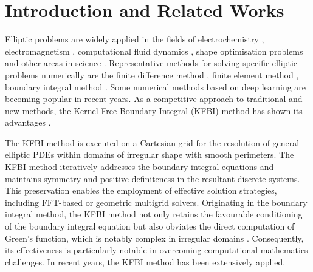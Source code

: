 \documentclass{article}
\begin{document}
\section{Introduction and Related Works}
Elliptic problems are widely applied in the fields of electrochemistry \cite{QIAN2021109908,DING2019108864}, electromagnetism \cite{Chai2023}, computational fluid dynamics \cite{Greengard1998318, Quartapelle1993NumericalSO}, shape optimisation problems \cite{ZHU2011752,gong2023} and other areas in science \cite{Chapko199747,ZHOU20061,CHENG2006616,SUN2014445}. Representative methods for solving specific elliptic problems numerically are the finite difference method \cite{zhou2006high, fedkiw1999non, leveque1994immersed, mccorquodale2001cartesian, berthelsen2004decomposed,johansen1998cartesian,twizell1996second,wiegmann2000explicit,hou2012numerical}, finite element method \cite{li2003newinterface,li1999fem,HUANG2017439,chu2010, wen2018finite, HOU2005411} , boundary integral method \cite{jwason1963,YING2004591,YING2006247,greengard_rokhlin_1997}. Some numerical methods based on deep learning \cite{E2018deepRitz,Raissi2019a,lulu2021deeponet,li2021fourier,Zang_2020,fan2023decoupling,HU2022111576,HE2022114358} are becoming popular in recent years. As a competitive approach to traditional and new methods, the Kernel-Free Boundary Integral (KFBI) method \cite{ying2007kernel,ying2014kernel,ying2013kernel} has shown its advantages .

The KFBI method is executed on a Cartesian grid for the resolution of general elliptic PDEs within domains of irregular shape with smooth perimeters. The KFBI method iteratively addresses the boundary integral equations and maintains symmetry and positive definiteness in the resultant discrete systems. This preservation enables the employment of effective solution strategies, including FFT-based or geometric multigrid solvers. Originating in the boundary integral method, the KFBI method not only retains the favourable conditioning of the boundary integral equation but also obviates the direct computation of Green's function, which is notably complex in irregular domains \cite{xie2019fourth, ying2013kernel}. Consequently, its effectiveness is particularly notable in overcoming computational mathematics challenges. In recent years, the KFBI method has been extensively applied\cite{xie2019fourth,xie2021cartesian,ZHAO2023116163,dong2023kernelfree,zhou2023adi}.
\end{document}
